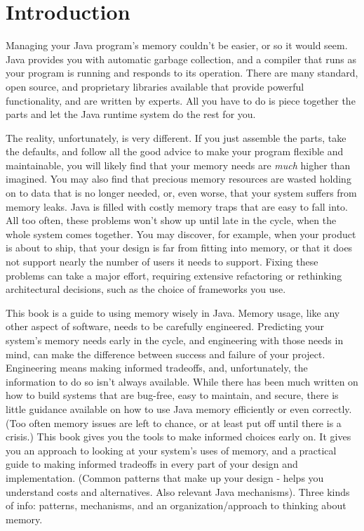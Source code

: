
\chapter{Introduction}
\label{chapter:introduction}

Managing your Java program's memory couldn't be easier, or so it would
seem. Java provides you with automatic garbage collection, and a compiler that
runs as your program is running and responds to its operation. There are many
standard, open source, and proprietary libraries available that provide powerful
functionality, and are written by experts. All you have to do is piece together
the parts and let the Java runtime system do the rest for you.

The reality, unfortunately, is very different. If you just assemble the parts, take
the defaults, and follow all the good advice to make your
program flexible and maintainable, you will likely find that your memory needs are
\emph{much} higher than imagined. You may also find that precious memory
resources are wasted holding on to data that is no longer needed, or, even
worse, that your system suffers from memory leaks. Java is filled with
costly memory traps that are easy to fall into.  All too often, these problems
won't show up until late in the cycle, when the whole system comes together. 
You may discover, for example, when your product is about to ship, that your design is
far from fitting into memory, or that it does not support nearly the number
of users it needs to support. Fixing these problems can
take a major effort, requiring extensive refactoring or rethinking
architectural decisions, such as the choice of frameworks you use.

This book is a guide to using memory wisely in Java. Memory usage,
like any other aspect of software, needs to be carefully
engineered. Predicting
your system's memory needs early in the cycle, and engineering with those needs in mind, can make
the difference between success and failure of your project. Engineering means making
informed tradeoffs, and, unfortunately, the information
to do so isn't always available. While there has been much written on how to
build systems that are bug-free, easy to maintain, and secure,
there is little guidance available on how to use Java memory efficiently
or even correctly. (Too often memory issues are left to chance, or at least
put off until there is a crisis.)  This book gives you the tools to make
informed choices early on.  It gives you 
an approach to looking at your system's uses of memory, and a practical guide
to making informed tradeoffs in every part of your design and
implementation.  (Common patterns that make up your design - helps you understand costs and alternatives.  Also 
relevant Java mechanisms).  Three kinds of info: patterns, mechanisms, and an
organization/approach to thinking about memory.

